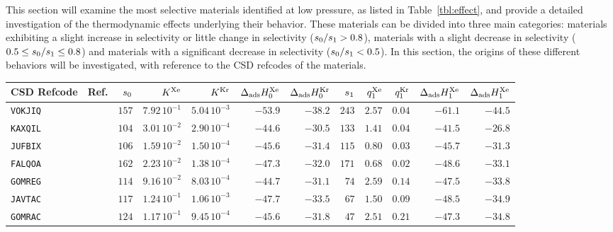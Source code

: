 \documentclass[main.tex]{subfiles}
\begin{document}
This section will examine the most selective materials identified at low pressure, as listed in Table~\ref{tbl:effect}, and provide a detailed investigation of the thermodynamic effects underlying their behavior. These materials can be divided into three main categories: materials exhibiting a slight increase in selectivity or little change in selectivity ($s_{\text{0}}/s_{\text{1}} > 0.8$), materials with a slight decrease in selectivity ($0.5 \le s_{\text{0}}/s_{\text{1}} \le 0.8$) and materials with a significant decrease in selectivity ($s_{\text{0}}/s_{\text{1}} < 0.5$). In this section, the origins of these different behaviors will be investigated, with reference to the CSD refcodes of the materials.

  
\begin{table}[hb]
  \centering
  \fontsize{8.5}{10.5}\selectfont
  \setlength{\extrarowheight}{1pt}
    \begin{tabular}{|lr|rrrrr|rrrrr|}
    \hline
          CSD Refcode & Ref. &  $s_{\text{0}}$ &  $K^{\text{Xe}}$ &  $K^{\text{Kr}}$ &  $\Delta_{\text{ads}}H^{\text{Xe}}_{\text{0}}$ &  $\Delta_{\text{ads}}H^{\text{Kr}}_{\text{0}}$  &  $s_{\text{1}}$ &  $q^{\text{Xe}}_{\text{1}}$ &  $q^{\text{Kr}}_{\text{1}}$ &  $\Delta_{\text{ads}}H^{\text{Xe}}_{\text{1}}$ &  $\Delta_{\text{ads}}H^{\text{Xe}}_{\text{1}}$ \\
    \hline
        \texttt{VOKJIQ} & \cite{VOKJIQ}        &  $157$  &  $7.92\,10^{-1}$  &  $5.04\,10^{-3}$  &  $-53.9$  &  $-38.2$  &  $243$  &  $2.57$  &  $0.04$  &  $-61.1$  &  $-44.5$  \\
        \texttt{KAXQIL} & \cite{KAXQIL}        &  $104$  &  $3.01\,10^{-2}$  &  $2.90\,10^{-4}$  &  $-44.6$  &  $-30.5$  &  $133$  &  $1.41$  &  $0.04$  &  $-41.5$  &  $-26.8$  \\
        \texttt{JUFBIX} & \cite{JUFBIX}        &  $106$  &  $1.59\,10^{-2}$  &  $1.50\,10^{-4}$  &  $-45.6$  &  $-31.4$  &  $115$  &  $0.80$  &  $0.03$  &  $-45.7$  &  $-31.3$  \\
        \texttt{FALQOA} & \cite{FALQOA}        &  $162$  &  $2.23\,10^{-2}$  &  $1.38\,10^{-4}$  &  $-47.3$  &  $-32.0$  &  $171$  &  $0.68$  &  $0.02$  &  $-48.6$  &  $-33.1$  \\
        \texttt{GOMREG} & \cite{GOMREG_GOMRAC} &  $114$  &  $9.16\,10^{-2}$  &  $8.03\,10^{-4}$  &  $-44.7$  &  $-31.1$  &  $ 74$  &  $2.59$  &  $0.14$  &  $-47.5$  &  $-33.8$  \\
        \texttt{JAVTAC} & \cite{JAVTAC}        &  $117$  &  $1.24\,10^{-1}$  &  $1.06\,10^{-3}$  &  $-47.7$  &  $-33.5$  &  $ 67$  &  $1.50$  &  $0.09$  &  $-48.5$  &  $-34.9$  \\
        \texttt{GOMRAC} & \cite{GOMREG_GOMRAC} &  $124$  &  $1.17\,10^{-1}$  &  $9.45\,10^{-4}$  &  $-45.6$  &  $-31.8$  &  $ 47$  &  $2.51$  &  $0.21$  &  $-47.3$  &  $-34.8$  \\

\end{tabular}
\end{table}
\end{document}
